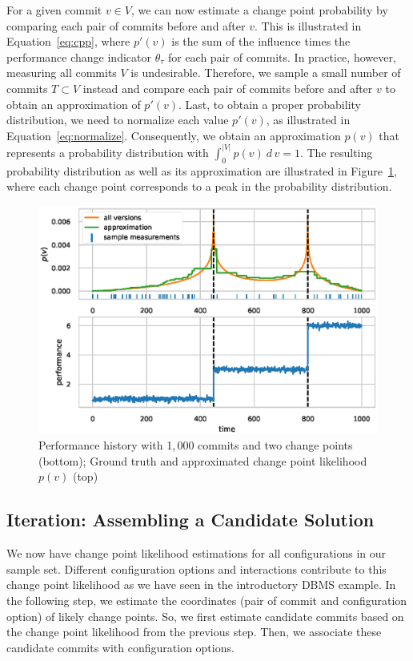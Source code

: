 \documentclass[sigconf, screen]{acmart}
\begin{document}
	For a given commit $v\in V$, we can now estimate a change point probability by comparing each pair of commits before and after $v$.
	This is illustrated in Equation~\ref{eq:cpp}, where $p'(v)$ is the sum of the influence times the performance change indicator $\theta_\tau$ for each pair of commits.
	In practice, however, measuring all commits $V$ is undesirable.
	Therefore, we sample a small number of commits $T \subset V$ instead and compare each pair of commits before and after $v$ to obtain an approximation of $p'(v)$.
	Last, to obtain a proper probability distribution, we need to normalize each value $p'(v)$, as illustrated in Equation~\ref{eq:normalize}.
	Consequently, we obtain an approximation $p(v)$ that represents a probability distribution with $\int_0^{\vert V\vert} p(v)\ d\,v = 1$. The resulting probability distribution as well as its approximation are illustrated in Figure~\ref{fig:cpp_example}, where each change point corresponds to a peak in the probability distribution.
	
	\begin{figure}
		\centering
		\includegraphics[width=\linewidth]{images/cpp_example.eps}
		\caption{Performance history with 1,\,000 commits and two change points (bottom); Ground truth and approximated change point likelihood $p(v)$ (top)}
		\label{fig:cpp_example}
	\end{figure}
	
	\subsection{Iteration: Assembling a Candidate Solution}\label{sec:candidatesolution}
	We now have change point likelihood estimations for all configurations in our sample set. 
	Different configuration options and interactions contribute to this change point likelihood as we have seen in the introductory DBMS example. 
	In the following step, we estimate the coordinates (pair of commit and configuration option) of likely change points. 
	So, we first estimate candidate commits based on the change point likelihood from the previous step. 
	Then, we associate these candidate commits with configuration options.
	
\end{document}
